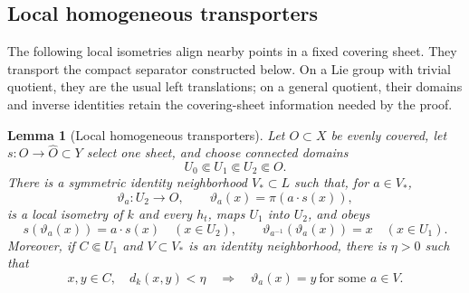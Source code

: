 \documentclass[10pt,a4paper]{article}
\numberwithin{equation}{section}
\newtheorem{lemma}[theorem]{Lemma}
\theoremstyle{definition}
\theoremstyle{remark}
\begin{document}
\subsection{Local homogeneous transporters}

The following local isometries align nearby points in a fixed covering
sheet.  They transport the compact separator constructed below.  On a Lie
group with trivial quotient, they are the usual left translations; on a
general quotient, their domains and inverse identities retain the
covering-sheet information needed by the proof.

\begin{lemma}[Local homogeneous transporters]
\label{lem:transporters}
Let $O\subset X$ be evenly covered, let
$s:O\to\widehat O\subset Y$ select one sheet, and choose connected domains
\[
 U_0\Subset U_1\Subset U_2\Subset O.
\]
There is a symmetric identity neighborhood $V_*\subset L$ such that, for
$a\in V_*$,
\begin{equation}
 \vartheta_a:U_2\longrightarrow O,\qquad
 \vartheta_a(x)=\pi(a\cdot s(x)),
 \label{eq:transporter}
\end{equation}
is a local isometry of $k$ and every $h_t$, maps $U_1$ into $U_2$, and
obeys
\begin{equation}
 s(\vartheta_a(x))=a\cdot s(x)\quad(x\in U_2),
 \qquad
 \vartheta_{a^{-1}}(\vartheta_a(x))=x\quad(x\in U_1).
 \label{eq:transporter-inverse}
\end{equation}
Moreover, if $C\Subset U_1$ and $V\subset V_*$ is an identity neighborhood,
there is $\eta>0$ such that
\begin{equation}
 x,y\in C,\quad d_k(x,y)<\eta
 \quad\Longrightarrow\quad
 \vartheta_a(x)=y\ \text{for some }a\in V.
 \label{eq:transporter-alignment}
\end{equation}
\end{lemma}
\end{document}

